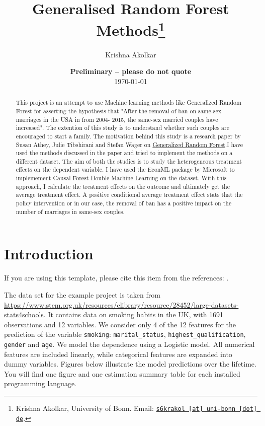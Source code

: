 \documentclass[11pt, a4paper, leqno]{article}
\begin{document}
\title{Generalised Random Forest Methods\thanks{Krishna Akolkar, University of Bonn. Email: \href{mailto:s6krakol@uni-bonn.de}{\nolinkurl{s6krakol [at] uni-bonn [dot] de}}.}}

\author{Krishna Akolkar}

\date{
    {\bf Preliminary -- please do not quote}
    \\[1ex]
    \today
}

\maketitle


\begin{abstract}
    This project is an attempt to use Machine learning methods like Generalized Random Forest for asserting the hypothesis that "After the removal of 
    ban on same-sex marriages in the USA in from 2004- 2015, the same-sex married couples have increased". The extention of this study is to understand 
    whether such couples are encouraged to start a family. The motivation behind this study is a research paper by Susan Athey, Julie Tibshirani and 
    Stefan Wager on \href{https://arxiv.org/pdf/1610.01271}{Generalized Random Forest}.I have used the methods discussed in the paper and tried to implement 
    the methods on a different dataset. The aim of both the studies is to study the heterogeneous treatment effects on the dependent variable. I have used
    the EconML package by Microsoft to implemement Causal Forest Double Machine Learning on the dataset. With this approach, I calculate the treatment effects
    on the outcome and ultimately get the average treatment effect. A positive conditional average treatment effect stats that the policy intervention or in 
    our case, the removal of ban has a positive impact on the number of marriages in same-sex couples.
\end{abstract}

\clearpage


\section{Introduction} %
\label{sec:introduction}

If you are using this template, please cite this item from the references:
\citet{GaudeckerEconProjectTemplates}.

The data set for the example project is taken from
\url{https://www.stem.org.uk/resources/elibrary/resource/28452/large-datasets-stats4schools}.
It contains data on smoking habits in the UK, with 1691 observations and 12 variables.
We consider only 4 of the 12 features for the prediction of the variable
\texttt{smoking}: \texttt{marital\_status}, \texttt{highest\_qualification},
\texttt{gender} and \texttt{age}. We model the dependence using a Logistic model. All
numerical features are included linearly, while categorical features are expanded into
dummy variables. Figures below illustrate the model predictions over the lifetime. You
will find one figure and one estimation summary table for each installed programming
language.
\end{document}
